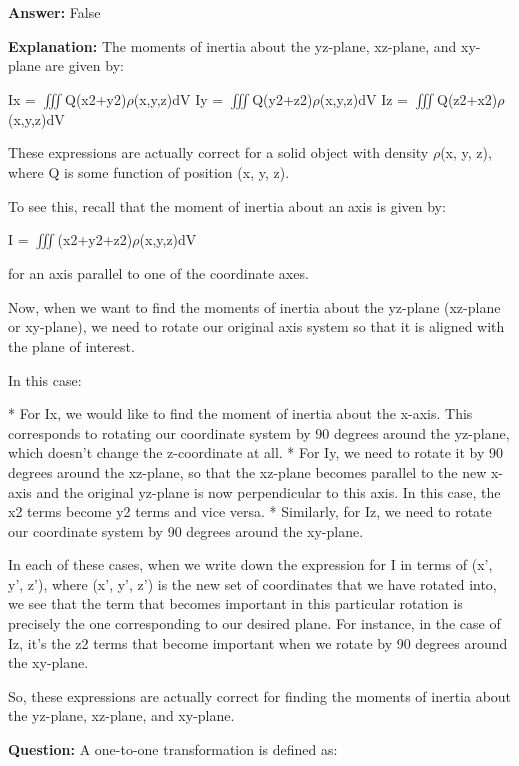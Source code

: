 \documentclass{article}
\begin{document}
                \textbf{Answer:} False

                \textbf{Explanation:} The moments of inertia about the yz-plane, xz-plane, and xy-plane are given by:

Ix = \ensuremath{\iiint}Q(x2+y2)\ensuremath{\rho}(x,y,z)dV
Iy = \ensuremath{\iiint}Q(y2+z2)\ensuremath{\rho}(x,y,z)dV
Iz = \ensuremath{\iiint}Q(z2+x2)\ensuremath{\rho}(x,y,z)dV

These expressions are actually correct for a solid object with density \ensuremath{\rho}(x, y, z), where Q is some function of position (x, y, z).

To see this, recall that the moment of inertia about an axis is given by:

I = \ensuremath{\iiint}(x2+y2+z2)\ensuremath{\rho}(x,y,z)dV

for an axis parallel to one of the coordinate axes. 

Now, when we want to find the moments of inertia about the yz-plane (xz-plane or xy-plane), we need to rotate our original axis system so that it is aligned with the plane of interest.

In this case:

* For Ix, we would like to find the moment of inertia about the x-axis. This corresponds to rotating our coordinate system by 90 degrees around the yz-plane, which doesn't change the z-coordinate at all.
* For Iy, we need to rotate it by 90 degrees around the xz-plane, so that the xz-plane becomes parallel to the new x-axis and the original yz-plane is now perpendicular to this axis. In this case, the x2 terms become y2 terms and vice versa.
* Similarly, for Iz, we need to rotate our coordinate system by 90 degrees around the xy-plane.

In each of these cases, when we write down the expression for I in terms of (x', y', z'), where (x', y', z') is the new set of coordinates that we have rotated into, we see that the term that becomes important in this particular rotation is precisely the one corresponding to our desired plane. For instance, in the case of Iz, it's the z2 terms that become important when we rotate by 90 degrees around the xy-plane.

So, these expressions are actually correct for finding the moments of inertia about the yz-plane, xz-plane, and xy-plane.
                
                \vspace{0.5cm} 
        
            
                \textbf {Question:} A one-to-one transformation is defined as: 
\end{document}
